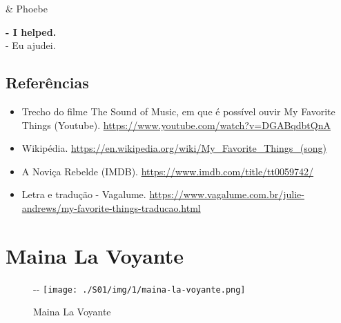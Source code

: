 \begin{tcolorbox}[enhanced,center upper,
    drop fuzzy shadow southeast, boxrule=0.3pt,
    lower separated=false,
    colframe=black!30!dialogoBorder,colback=white]
\begin{minipage}[c]{0.14\linewidth}
   & \centering \scriptsize{Phoebe}
\end{minipage}
\hspace{.1mm}
\begin{minipage}[c]{0.8\linewidth}
  \textbf{- I helped.}\\
  - Eu ajudei.
\end{minipage}
\end{tcolorbox}

\hypertarget{referuxeancias-2}{%
\subsection{Referências}\label{referuxeancias-2}}

\begin{itemize}
\tightlist
\item
  \sloppy Trecho do filme The Sound of Music, em que é possível ouvir My Favorite Things (Youtube). \url{https://www.youtube.com/watch?v=DGABqdbtQnA}
\item
  \sloppy Wikipédia. \url{https://en.wikipedia.org/wiki/My_Favorite_Things_(song)}
\item
  \sloppy A Noviça Rebelde (IMDB). \url{https://www.imdb.com/title/tt0059742/}
\item
  \sloppy Letra e tradução - Vagalume. \url{https://www.vagalume.com.br/julie-andrews/my-favorite-things-traducao.html}
\end{itemize}

\hypertarget{maina-la-voyante}{%
\section{Maina La Voyante}\label{maina-la-voyante}}

\begin{figure}[!ht]
  \begin{adjustwidth}{-\oddsidemargin-1in}{-\rightmargin}
    \centering
    \texttt{[image: ./S01/img/1/maina-la-voyante.png]}
    \caption{Maina La Voyante\label{fig:maina-la-voyante}}
  \end{adjustwidth}
\end{figure}


